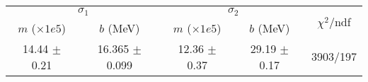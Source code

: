 \begin{tabular}{cc|cc||c}
\multicolumn{2}{c|}{$\sigma_1$} & \multicolumn{2}{|c}{$\sigma_2$}  & \multirow{2}{*}{$\chi^2/$ndf}\\
$m$ ($\times1e5$) & $b$ (MeV) & $m$ ($\times1e5$) & $b$ (MeV)  & \\
\hline
14.44 $\pm$ 0.21 & 16.365 $\pm$ 0.099 & 12.36 $\pm$ 0.37 & 29.19 $\pm$ 0.17 & 3903/197\\
\end{tabular}
